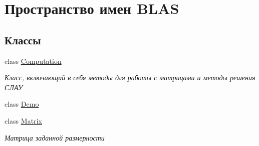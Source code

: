 \hypertarget{namespace_b_l_a_s}{}\section{Пространство имен B\+L\+AS}
\label{namespace_b_l_a_s}
\subsection*{Классы}
\begin{DoxyCompactItemize}
\item 
class \hyperlink{class_b_l_a_s_1_1_computation}{Computation}
\begin{DoxyCompactList}\small\item\em Класс, включающий в себя методы для работы с матрицами и методы решения СЛАУ \end{DoxyCompactList}\item 
class \hyperlink{class_b_l_a_s_1_1_demo}{Demo}
\item 
class \hyperlink{class_b_l_a_s_1_1_matrix}{Matrix}
\begin{DoxyCompactList}\small\item\em Матрица заданной размерности \end{DoxyCompactList}\end{DoxyCompactItemize}
